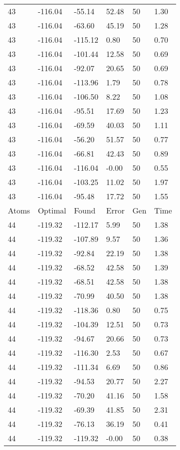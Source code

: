 \documentclass{report}
\begin{document}
\begin{appendix}
\begin{longtable}{llllll}
43 & -116.04 & -55.14 & 52.48 & 50 & 1.30 \\
43 & -116.04 & -63.60 & 45.19 & 50 & 1.28 \\
43 & -116.04 & -115.12 & 0.80 & 50 & 0.70 \\
43 & -116.04 & -101.44 & 12.58 & 50 & 0.69 \\
43 & -116.04 & -92.07 & 20.65 & 50 & 0.69 \\
43 & -116.04 & -113.96 & 1.79 & 50 & 0.78 \\
43 & -116.04 & -106.50 & 8.22 & 50 & 1.08 \\
43 & -116.04 & -95.51 & 17.69 & 50 & 1.23 \\
43 & -116.04 & -69.59 & 40.03 & 50 & 1.11 \\
43 & -116.04 & -56.20 & 51.57 & 50 & 0.77 \\
43 & -116.04 & -66.81 & 42.43 & 50 & 0.89 \\
43 & -116.04 & -116.04 & -0.00 & 50 & 0.55 \\
43 & -116.04 & -103.25 & 11.02 & 50 & 1.97 \\
43 & -116.04 & -95.48 & 17.72 & 50 & 1.55 \\
Atoms & Optimal & Found & Error & Gen & Time \\
44 & -119.32 & -112.17 & 5.99 & 50 & 1.38 \\
44 & -119.32 & -107.89 & 9.57 & 50 & 1.36 \\
44 & -119.32 & -92.84 & 22.19 & 50 & 1.38 \\
44 & -119.32 & -68.52 & 42.58 & 50 & 1.39 \\
44 & -119.32 & -68.51 & 42.58 & 50 & 1.38 \\
44 & -119.32 & -70.99 & 40.50 & 50 & 1.38 \\
44 & -119.32 & -118.36 & 0.80 & 50 & 0.75 \\
44 & -119.32 & -104.39 & 12.51 & 50 & 0.73 \\
44 & -119.32 & -94.67 & 20.66 & 50 & 0.73 \\
44 & -119.32 & -116.30 & 2.53 & 50 & 0.67 \\
44 & -119.32 & -111.34 & 6.69 & 50 & 0.86 \\
44 & -119.32 & -94.53 & 20.77 & 50 & 2.27 \\
44 & -119.32 & -70.20 & 41.16 & 50 & 1.58 \\
44 & -119.32 & -69.39 & 41.85 & 50 & 2.31 \\
44 & -119.32 & -76.13 & 36.19 & 50 & 0.41 \\
44 & -119.32 & -119.32 & -0.00 & 50 & 0.38 \\

\end{longtable}
\end{appendix}
\end{document}
